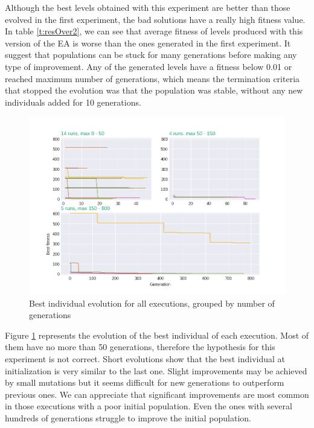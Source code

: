 \documentclass[sigconf]{acmart}
\begin{document}
Although the best levels obtained with this experiment are better than those 
evolved in the first experiment, the bad solutions have a really high fitness 
value. In table \ref{t:resOver2}, we can see that average fitness of levels 
produced with this version of the EA is worse than the ones generated in the 
first experiment. It suggest that populations can be stuck for many generations 
before making any type of improvement. Any of the generated levels have a 
fitness below 0.01 or reached maximum number of generations, which means the 
termination criteria that stopped the evolution was that the population was 
stable, without any new individuals added for 10 generations. 
\begin{figure}[H]
	\centering
	\includegraphics[scale=0.4]{exp2_explication.png}
	\caption{Best individual evolution for all executions, grouped by number of 
	generations}\label{f:grahp2}
\end{figure}
Figure \ref{f:grahp2} represents the evolution of the best individual of each 
execution. Most of them have no more than 50 generations, therefore the 
hypothesis for this experiment is not correct. Short evolutions show that the 
best individual at initialization is very similar to the last one. Slight 
improvements may be achieved by small mutations but it seems difficult for new 
generations to outperform previous ones. We can appreciate that significant 
improvements are most common in those executions with a poor initial 
population. Even the ones with several hundreds of generations struggle to 
improve the initial population.
\end{document}
